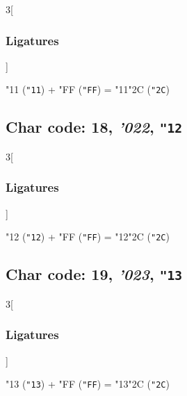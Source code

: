 \documentclass{article}
\newlength{\maxcharwidth}
\begin{document}
\begin{multicols}{3}[\subsubsection{Ligatures}]

{\testfont\char"11\noboundary} ({\tt"11}) + {\testfont\char"FF\noboundary} ({\tt"FF}) = {\testfont\char"11\noboundary}{\testfont\char"2C\noboundary} ({\tt"2C}) 

\end{multicols}

\subsection{Char code: 18, {\it'022}, {\tt"12}}
\label{char_18}


\begin{multicols}{3}[\subsubsection{Ligatures}]

{\testfont\char"12\noboundary} ({\tt"12}) + {\testfont\char"FF\noboundary} ({\tt"FF}) = {\testfont\char"12\noboundary}{\testfont\char"2C\noboundary} ({\tt"2C}) 

\end{multicols}

\subsection{Char code: 19, {\it'023}, {\tt"13}}
\label{char_19}


\begin{multicols}{3}[\subsubsection{Ligatures}]

{\testfont\char"13\noboundary} ({\tt"13}) + {\testfont\char"FF\noboundary} ({\tt"FF}) = {\testfont\char"13\noboundary}{\testfont\char"2C\noboundary} ({\tt"2C}) 

\end{multicols}
\end{document}
